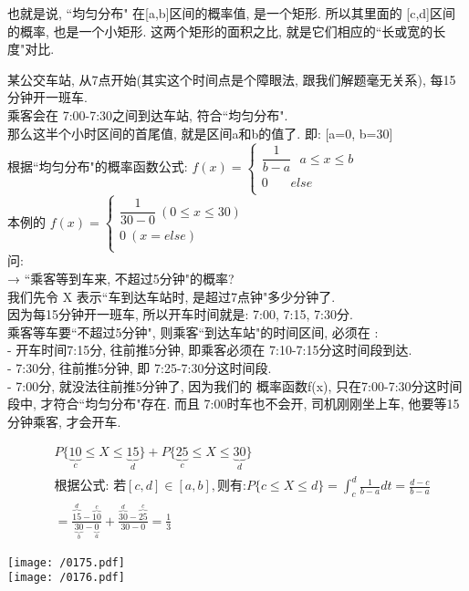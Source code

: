 \documentclass[UTF8]{ctexart}
\begin{document}
	也就是说, ``均匀分布" 在[a,b]区间的概率值, 是一个矩形. 所以其里面的 [c,d]区间的概率, 也是一个小矩形. 这两个矩形的面积之比, 就是它们相应的``长或宽的长度"对比. \\
	
	
	\begin{myEnvSample}
	某公交车站, 从7点开始(其实这个时间点是个障眼法, 跟我们解题毫无关系), 每15分钟开一班车. \\
	乘客会在 7:00-7:30之间到达车站, 符合``均匀分布". \\
	那么这半个小时区间的首尾值, 就是区间a和b的值了. 	即: [a=0, b=30] \\
	根据``均匀分布"的概率函数公式:
	$f\left( x \right) =\left\{ \begin{array}{l}
		\dfrac{1}{b-a}\ \ \ a\leq x\leq b\\
		0\ \ \ \ \ \ \ \ else\\
	\end{array} \right. $ \\
	本例的 
	$f\left( x \right) =\left\{ \begin{array}{l}
		\dfrac{1}{30-0} \ (0\leq x\leq 30)\\
		0 \ (x=else)\\
	\end{array} \right. $ \\

	问: \\
	→ ``乘客等到车来, 不超过5分钟"的概率? \\
	我们先令 X 表示``车到达车站时, 是超过7点钟"多少分钟了. \\
	
	因为每15分钟开一班车, 所以开车时间就是: 7:00, 7:15, 7:30分. \\
	乘客等车要``不超过5分钟", 则乘客``到达车站"的时间区间, 必须在 : \\
	- 开车时间7:15分, 往前推5分钟, 即乘客必须在 7:10-7:15分这时间段到达. \\
	- 7:30分, 往前推5分钟, 即 7:25-7:30分这时间段. \\
	- 7:00分, 就没法往前推5分钟了, 因为我们的 概率函数f(x), 只在7:00-7:30分这时间段中, 才符合``均匀分布"存在. 而且 7:00时车也不会开, 司机刚刚坐上车, 他要等15分钟乘客, 才会开车.
	
	\begin{align*}  %
	&P\{\underset{c}{\underbrace{10}}\leq X\leq \underset{d}{\underbrace{15}}\}+P\{\underset{c}{\underbrace{25}}\leq X\leq \underset{d}{\underbrace{30}}\}\\
&\text{根据公式:\ 若}[c,d]\in \left[ a,b \right] ,\text{则有:}P\{c\leq X\leq d\}=\int_c^d{\frac{1}{b-a}}dt=\frac{d-c}{b-a}\\
&=\frac{\overset{d}{\overbrace{15}}-\overset{c}{\overbrace{10}}}{\underset{b}{\underbrace{30}}-\underset{a}{\underbrace{0}}}+\frac{\overset{d}{\overbrace{30}}-\overset{c}{\overbrace{25}}}{30-0}=\frac{1}{3}
	\end{align*}

	\texttt{[image: /0175.pdf]} \\
	
	\texttt{[image: /0176.pdf]} \\
	
	
	\end{myEnvSample}
	
	
\end{document}
